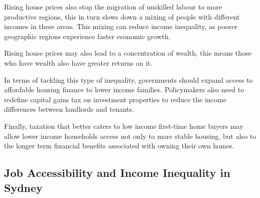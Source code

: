 Rising house prices also stop the migration of unskilled labour to more productive regions, this in turn slows down a mixing of people with different incomes in these areas. This mixing can reduce income inequality, as poorer geographic regions experience faster economic growth.

Rising house prices may also lead to a concentration of wealth, this means those who have wealth also have greater returns on it.

In terms of tackling this type of inequality, governments should expand access to affordable housing finance to lower income families. Policymakers also need to redefine capital gains tax on investment properties to reduce the income differences between landlords and tenants.

Finally, taxation that better caters to low income first-time home buyers may allow lower income households access not only to more stable housing, but also to the longer term financial benefits associated with owning their own homes.


\subsection{Job Accessibility and Income Inequality in Sydney}

